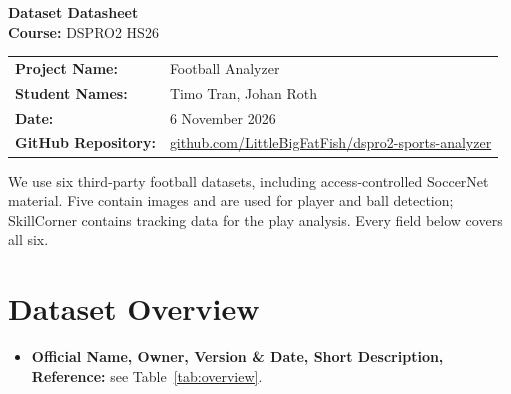 \documentclass[11pt, a4paper]{article}
\begin{document}
\sloppy

\begin{center}
    {\huge \bfseries \color{primaryBlue} Dataset Datasheet} \\[0.2cm]
    {\large \textbf{Course:} DSPRO2 HS26} \\[0.1cm]
\end{center}

\vspace{0.4cm}

\begin{studentbox}
    \begin{tabularx}{\textwidth}{l X}
        \textbf{Project Name:} & Football Analyzer \\
        \textbf{Student Names:} & Timo Tran, Johan Roth \\
        \textbf{Date:} & 6 November 2026 \\
        \textbf{GitHub Repository:} & \url{github.com/LittleBigFatFish/dspro2-sports-analyzer} \\
    \end{tabularx}
\end{studentbox}

\vspace{0.3cm}

\noindent We use six third-party football datasets, including access-controlled SoccerNet material. Five contain images and are used for player and ball detection; SkillCorner contains tracking data for the play analysis. Every field below covers all six.

\section{Dataset Overview}
\begin{itemize}
    \item \textbf{Official Name, Owner, Version \& Date, Short Description, Reference:} see Table~\ref{tab:overview}.
\end{itemize}
\end{document}
